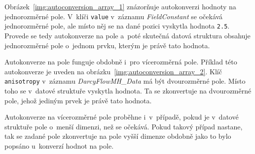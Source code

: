\documentclass[FM,bw,DP]{tulthesis}
\begin{document}
Obrázek~\ref{img:autoconversion_array_1} znázorňuje autokonverzi hodnoty na jednorozměrné pole. V~klíči \texttt{value} v~záznamu \textit{FieldConstant} se očekává jednorozměrné pole, ale místo něj se na dané pozici vyskytla hodnota \texttt{2.5}. Provede se tedy autokonverze na pole a~poté skutečná datová struktura obsahuje jednorozměrné pole o~jednom prvku, kterým je právě tato hodnota.

Autokonverze na pole funguje obdobně i~pro vícerozměrná pole. Příklad této autokonverze je uveden na obrázku~\ref{img:autoconversion_array_2}. Klíč \texttt{anisotropy} v~záznamu \textit{DarcyFlowMH\_Data} má být dvourozměrné pole. Místo toho se v~datové struktuře vyskytla hodnota. Ta se zkonvertuje na dvourozměrné pole, jehož jediným prvek je právě tato hodnota.

Autokonverze na vícerozměrné pole proběhne i~v~případě, pokud je v~datové struktuře pole o~menší dimenzi, než se očekává. Pokud takový případ nastane, tak se zadané pole zkonvertuje na pole vyšší dimenze obdobně jako to bylo popsáno u~konverzí hodnot na pole.
\end{document}
